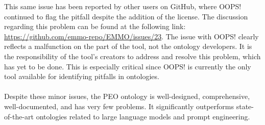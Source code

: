 This same issue has been reported by other users on GitHub, where OOPS! continued to flag the pitfall despite the addition of the license. The discussion regarding this problem can be found at the following link:\\ \href{https://github.com/emmo-repo/EMMO/issues/23}{https://github.com/emmo-repo/EMMO/issues/23}.
The issue with OOPS! clearly reflects a malfunction on the part of the tool, not the ontology developers. It is the responsibility of the tool's creators to address and resolve this problem, which has yet to be done. This is especially critical since OOPS! is currently the only tool available for identifying pitfalls in ontologies.\\\\
Despite these minor issues, the PEO ontology is well-designed, comprehensive, well-documented, and has very few problems. It significantly outperforms state-of-the-art ontologies related to large language models and prompt engineering.